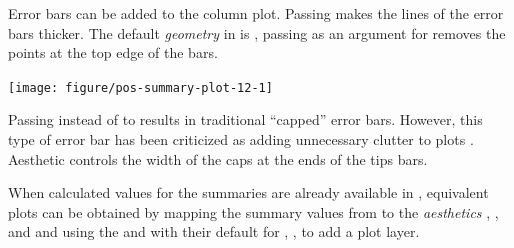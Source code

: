 \documentclass[krantz2]{krantz}\usepackage{knitr}
\begin{document}
\begin{knitrout}\footnotesize
{}\color{fgcolor}\begin{kframe}
\begin{alltt}
 \hlkwb{<-}
  \hlstd{(}   \hlstd{=} \hlstd{(}    \hlopt{+}
  \hlstd{(} \hlstd{=} \hlstd{,}  
\end{alltt}
\end{kframe}
\end{knitrout}

Error bars can be added to the column plot. Passing  makes the lines of the error bars thicker. The default \emph{geometry} in  is , passing  as an argument for  removes the points at the top edge of the bars.

\begin{knitrout}\footnotesize
{}\color{fgcolor}\begin{kframe}
\begin{alltt}
 \hlopt{+}
  \hlstd{(} \hlstd{=} \hlstd{,}  \hlstd{=} \hlstd{,}
                \hlstd{=} \hlstd{,}  \hlstd{=} \hlstd{)}
\end{alltt}
\end{kframe}

{\centering \texttt{[image: figure/pos-summary-plot-12-1]} 

}


\end{knitrout}

Passing  instead of  to  results in traditional ``capped'' error bars. However, this type of error bar has been criticized as adding unnecessary clutter to plots \autocite{Tufte1983}. Aesthetic  controls the width of the caps at the ends of the tips bars.

When calculated values for the summaries are already available in , equivalent plots can be obtained by mapping the summary values from  to the \emph{aesthetics} , ,  and  and using the   and  with their default for , , to add a plot layer.
\end{document}
